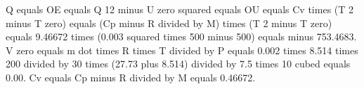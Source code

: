 Q equals OE equals Q 12 minus U zero squared equals OU equals Cv times (T 2 minus T zero) equals (Cp minus R divided by M) times (T 2 minus T zero) equals 9.46672 times (0.003 squared times 500 minus 500) equals minus 753.4683.  
V zero equals m dot times R times T divided by P equals 0.002 times 8.514 times 200 divided by 30 times (27.73 plus 8.514) divided by 7.5 times 10 cubed equals 0.00.  
Cv equals Cp minus R divided by M equals 0.46672.